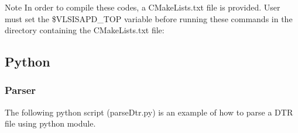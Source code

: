 \begin{DoxyNote}{Note}
In order to compile these codes, a C\-Make\-Lists.\-txt file is provided. User must set the \$\-V\-L\-S\-I\-S\-A\-P\-D\-\_\-\-T\-O\-P variable before running these commands in the directory containing the C\-Make\-Lists.\-txt file\-: 
\begin{DoxyCode}
\end{DoxyCode}

\end{DoxyNote}
\hypertarget{dtr_dtrPython}{}\subsection{Python}\label{dtr_dtrPython}
\hypertarget{dtr_dtrParsePython}{}\subsubsection{Parser}\label{dtr_dtrParsePython}
The following python script ({\ttfamily parse\-Dtr.\-py}) is an example of how to parse a D\-T\-R file using python module. 
